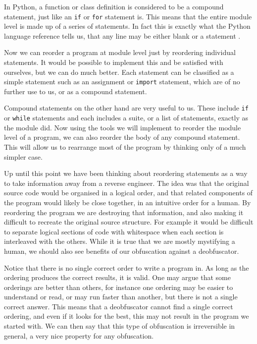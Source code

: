 \documentclass[twoside,a4paper]{report}
\begin{document}
In Python, a function or class definition is considered to be a compound statement, just like an \texttt{if} or \texttt{for} statement is. This
means that the entire module level is made up of a series of statements. In fact this is exactly what the Python language reference tells us, that
any line may be either blank or a statement \cite{fileformat}.

Now we can reorder a program at module level just by reordering individual statements. It would be possible to implement this and be satisfied with
ourselves, but we can do much better. Each statement can be classified as a simple statement such as an assignment or \texttt{import} statement,
which are of no further use to us, or as a compound statement.

Compound statements on the other hand are very useful to us. These include \texttt{if} or \texttt{while} statements and each includes a suite, or
a list of statements, exactly as the module did. Now using the tools we will implement to reorder the module level of a program, we can also reorder
the body of any compound statement. This will allow us to rearrange most of the program by thinking only of a much simpler case.

Up until this point we have been thinking about reordering statements as a way to take information away from a reverse engineer. The idea was that
the original source code would be organised in a logical order, and that related components of the program would likely be close together, in an intuitive
order for a human. By reordering the program we are destroying that information, and also making it difficult to recreate the original source structure. For
example it would be difficult to separate logical sections of code with whitespace when each section is interleaved with the others. While it is true that we
are mostly mystifying a human, we should also see benefits of our obfuscation against a deobfuscator.

Notice that there is no single correct order to write a program in. As long as the ordering produces the correct results, it is valid. One may argue that
some orderings are better than others, for instance one ordering may be easier to understand or read, or may run faster than another, but there is not
a single correct answer. This means that a deobfuscator cannot find a single correct ordering, and even if it looks for the best, this may not result in
the program we started with. We can then say that this type of obfuscation is irreversible in general, a very nice property for any obfuscation. 
\end{document}
